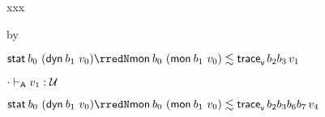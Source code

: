 {\begin{lamportproof*}
    \begin{pfproof}
      xxx
    \end{pfproof}

    \begin{pfproof}
      \absurdstep
        \begin{pfproof}
          by 
        \end{pfproof}
    \end{pfproof}

    \begin{pfproof}
      \qedstep
        \begin{pfproof}
          $\estab{\sbnd_0}{(\edynb{\sbnd_1}{\svalue_0})} \rredN \rexpr{\emon{\sbnd_0}{(\emon{\sbnd_1}{\svalue_0})}}{\ehist{\fconcat{\sbnd_2}{\sbnd_3}}{\svalue_1}}$
        \end{pfproof}
    \end{pfproof}

    \begin{pfproof}
      \absurdstep
        \begin{pfproof}
          ${\cdot} \vdash_{\mathsf{A}} v_1 : {\mathcal U}$
        \end{pfproof}
    \end{pfproof}

    \begin{pfproof}
      \qedstep
        \begin{pfproof}
          $\estab{\sbnd_0}{(\edynb{\sbnd_1}{\svalue_0})} \rredN \rexpr{\emon{\sbnd_0}{(\emon{\sbnd_1}{\svalue_0})}}{\ehist{\fconcat{\sbnd_2}{\fconcat{\sbnd_3}{\fconcat{\sbnd_6}{\sbnd_7}}}}{\svalue_4}}$
        \end{pfproof}
    \end{pfproof}


\end{lamportproof*}}
